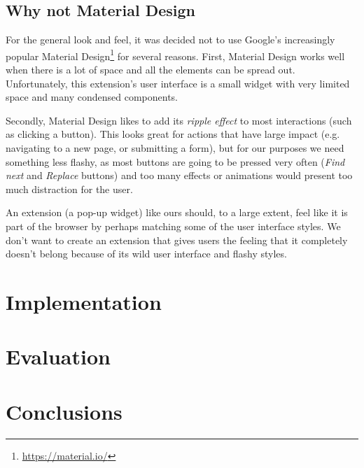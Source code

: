 \documentclass[bsc,frontabs,twoside,singlespacing,parskip,deptreport]{infthesis}
\begin{document}
\section{Why not Material Design}
For the general look and feel, it was decided not to use Google's increasingly popular Material Design\footnote{\href{https://material.io/}{https://material.io/}} for several reasons. First, Material Design works well when there is a lot of space and all the elements can be spread out. Unfortunately, this extension's user interface is a small widget with very limited space and many condensed components.

Secondly, Material Design likes to add its \textit{ripple effect} to most interactions (such as clicking a button). This looks great for actions that have large impact (e.g. navigating to a new page, or submitting a form), but for our purposes we need something less flashy, as most buttons are going to be pressed very often (\textit{Find next} and \textit{Replace} buttons) and too many effects or animations would present too much distraction for the user.

An extension (a pop-up widget) like ours should, to a large extent, feel like it is part of the browser by perhaps matching some of the user interface styles. We don't want to create an extension that gives users the feeling that it completely doesn't belong because of its wild user interface and flashy styles.

\chapter{Implementation}


\chapter{Evaluation}

\chapter{Conclusions}



\end{document}
